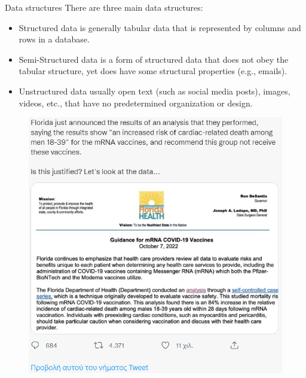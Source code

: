 \documentclass[
  ignorenonframetext,
]{beamer}
\begin{document}
\begin{frame}{Data structures}
\protect\hypertarget{data-structures}{}
There are three main data structures:

\begin{itemize}
\item
  {Structured} data is generally tabular data that is represented by
  {columns} and {rows} in a database.
\item
  {Semi-Structured} data is a form of structured data that does not obey
  the tabular structure, yet does have some structural properties (e.g.,
  emails).
\item
  {Unstructured} data usually open text (such as social media posts),
  images, videos, etc., that have {no predetermined organization or
  design}.
\end{itemize}

\begin{figure}

{\centering \includegraphics{images_slides/tweet.png}

}

\end{figure}


\end{frame}
\end{document}
